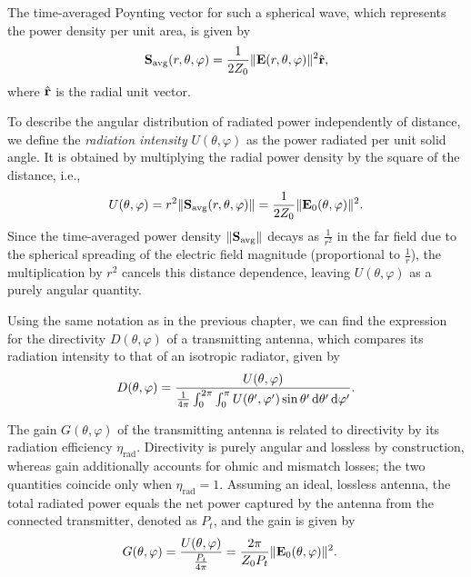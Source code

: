The time-averaged Poynting vector for such a spherical wave, which represents the power density per unit area, is given by
\begin{equation}
  \mathbf{S}_{\text{avg}}(r, \theta, \varphi) = \frac{1}{2Z_0} \|\mathbf{E}(r, \theta, \varphi)\|^2 \hat{\mathbf{r}},
\end{equation}
where $\hat{\mathbf{r}}$ is the radial unit vector.

To describe the angular distribution of radiated power independently of distance, we define the \emph{radiation intensity} $U(\theta, \varphi)$ as the power radiated per unit solid angle. It is obtained by multiplying the radial power density by the square of the distance, i.e.,
\begin{equation}
  U(\theta, \varphi) = r^2 \|\mathbf{S}_{\text{avg}}(r, \theta, \varphi)\| = \frac{1}{2Z_0} \|\mathbf{E}_0(\theta, \varphi)\|^2.
\end{equation}
Since the time-averaged power density $\|\mathbf{S}_{\text{avg}}\|$ decays as $\tfrac{1}{r^2}$ in the \gls{far field} due to the spherical spreading of the electric field magnitude (proportional to $\tfrac{1}{r}$), the multiplication by $r^2$ cancels this distance dependence, leaving $U(\theta, \varphi)$ as a purely angular quantity.

Using the same notation as in the previous chapter, we can find the expression for the directivity $D(\theta, \varphi)$ of a transmitting antenna, which compares its radiation intensity to that of an isotropic radiator, given by
\begin{equation}\labeq{antenna-directivity}
  D(\theta, \varphi) = \frac{U(\theta, \varphi)}{\frac{1}{4\pi}\int_{0}^{2\pi}\int_{0}^{\pi} U(\theta', \varphi') \sin\theta' \, \mathrm{d}\theta' \, \mathrm{d}\varphi'}.
\end{equation}

The gain $G(\theta, \varphi)$ of the transmitting antenna is related to directivity by its radiation efficiency $\eta_{\text{rad}}$. Directivity is purely angular and lossless by construction, whereas gain additionally accounts for ohmic and mismatch losses; the two quantities coincide only when $\eta_{\text{rad}} = 1$. Assuming an ideal, lossless antenna, the total radiated power equals the net power captured by the antenna from the connected transmitter, denoted as $P_t$, and the gain is given by
\begin{align}\labeq{antenna-gain}
  G(\theta, \varphi) &= \frac{U(\theta, \varphi)}{\frac{P_t}{4\pi}} = \frac{2\pi}{Z_0 P_t} \|\bsup{E}_0(\theta, \varphi)\|^2.
\end{align}

